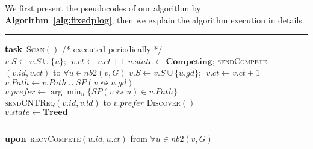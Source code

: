 \documentclass[10pt, conference, compsocconf]{IEEEtran}
\begin{document}
    We first present the pseudocodes of our algorithm by \textbf{Algorithm~\ref{alg:fixedplog}}, then we explain the algorithm execution in details.
\begin{algorithm}[h!]
\hrule
\textbf{task}~\textsc{Scan}$()$  \hfill /* \textsf{\small executed periodically} */ \label{ln:scanb} \\
       { \label{ln:coverb}
         {
           { \label{ln:count}
            $v.S \leftarrow v.S \cup \{u\};~~v.\mathit{ct} \leftarrow v.\mathit{ct} + 1$
          }
        }
 {
          $v.\mathit{state} \leftarrow \mathbf{Competing}$; \textsc{sendCompete}$(v.\mathit{id}, v.\mathit{ct})$ to $\forall u \in \mathit{nb2}(v,G)$ \label{ln:cvcomp}
        }
}
       {
         { \label{ln:pathqb}
           {
            $v.S \leftarrow v.S \cup \{u.\mathit{gd}\};~~v.\mathit{ct} \leftarrow v.\mathit{ct} + 1$ \\
            $v.\mathit{Path} \leftarrow v.\mathit{Path} \cup \mathit{SP}(v \leftrightsquigarrow u.\mathit{gd})$ \label{ln:pathqe}
          }
        }
         {
          $v.\mathit{prefer} \leftarrow \arg\min_u\{\mathit{SP}(v \leftrightsquigarrow u) \in v.\mathit{Path}\}$ \label{ln:ssp} \\
          \textsc{sendCNTReq}$(v.\mathit{id}, v.\mathit{ld})$ to $v.\mathit{prefer}$ \label{ln:ssps}
        }
      }
       {
        \textsc{Discover}$()$ \\
      }
       {
         {$v.\mathit{state} \leftarrow \mathbf{Treed}$} \label{ln:terminate} \\
         \label{ln:scane}
      }
\hrule
\textbf{upon}~\textsc{recvCompete}$(u.\mathit{id}, u.\mathit{ct})$ from $\forall u \in \mathit{nb2}(v,G)$ \\

\end{algorithm}
\end{document}
